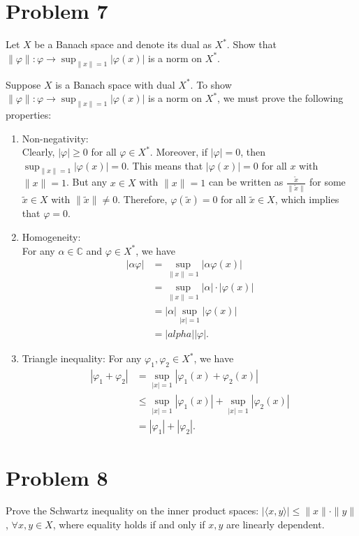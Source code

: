 \documentclass[12pt]{article}
\begin{document}
\newpage
\section{Problem 7}
\begin{mdframed}
    Let $X$ be a Banach space and denote its dual as $X^*$. Show that 
    $\|\varphi\|: \varphi \to \sup_{\|x\|=1} |\varphi(x)|$ is a norm on $X^*$.
\end{mdframed}

Suppose $X$ is a Banach space with dual $X^*$. To show 
$\|\varphi\|: \varphi \to \sup_{\|x\|=1} |\varphi(x)|$ is a norm on $X^*$, we must prove the following properties:

\begin{enumerate}
    \item Non-negativity: \\
        Clearly, $|\varphi|\geq 0$ for all $\varphi\in X^*$. Moreover, if $|\varphi|=0$, then $\sup_{\|x\|=1}|\varphi(x)|=0$. This means that $|\varphi(x)|=0$ for all $x$ with $\|x\|=1$. But any $x\in X$ with $\|x\|=1$ can be written as $\frac{\tilde{x}}{\|\tilde{x}\|}$ for some $\tilde{x}\in X$ with $\|\tilde{x}\|\neq 0$. Therefore, $\varphi(\tilde{x})=0$ for all $\tilde{x}\in X$, which implies that $\varphi=0$.
    \item Homogeneity: \\
    For any $\alpha\in\mathbb{C}$ and $\varphi\in X^*$, we have
        \begin{align*}
            |\alpha\varphi|&=\sup_{\|x\|=1}|\alpha\varphi(x)| \\
            &= \sup_{\|x\|=1}|\alpha|\cdot |\varphi(x)| \\
            &= |\alpha|\sup_{|x|=1}|\varphi(x)| \\
            &= |alpha||\varphi|.
        \end{align*}
    \item Triangle inequality:
    For any $\varphi_1,\varphi_2\in X^*$, we have
        \begin{align*}
            |\varphi_1+\varphi_2|&=\sup_{|x|=1}|\varphi_1(x)+\varphi_2(x)|\\
            &\leq \sup_{|x|=1}|\varphi_1(x)|+\sup_{|x|=1}|\varphi_2(x)|\\
            &=|\varphi_1|+|\varphi_2|.
        \end{align*}
\end{enumerate}




\newpage
\section{Problem 8}
\begin{mdframed}
    Prove the Schwartz inequality on the inner product spaces: $|\langle x, y \rangle| \leq \|x\| \cdot \|y\|$, 
    $\forall x,y\in X$, where equality holds if and only if $x,y$ are linearly dependent.
\end{mdframed}
\end{document}

